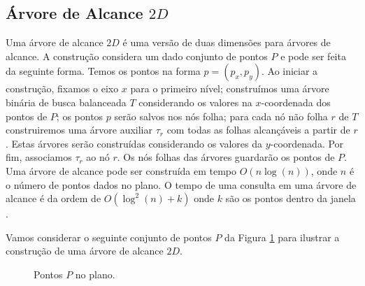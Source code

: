 \subsection{Árvore de Alcance $2D$}

Uma árvore de alcance $2D$ é uma versão de duas dimensões para árvores de alcance. A construção considera um dado conjunto de pontos $P$ e pode ser feita da seguinte forma.
Temos os pontos na forma $p = (p_x, p_y)$. Ao iniciar a construção, fixamos o eixo $x$ para o primeiro nível; construímos uma árvore binária de busca balanceada $T$ considerando os valores na $x$-coordenada dos pontos de $P$; os pontos $p$ serão salvos nos nós folha; para cada nó não folha $r$ de $T$ construiremos uma árvore auxiliar $\tau_r$ com todas as folhas alcançáveis a partir de $r$. Estas árvores serão construídas considerando os valores da $y$-coordenada. Por fim, associamos $\tau_r$ ao nó $r$. Os nós folhas das árvores guardarão os pontos de $P$. Uma árvore de alcance pode ser construída em tempo $O(n\log(n))$, onde $n$ é o número de pontos dados no plano. O tempo de uma consulta em uma árvore de alcance é da ordem de $O(\log^2(n) + k)$ onde $k$ são os pontos dentro da janela \cite{cg08}. %

Vamos considerar o seguinte conjunto de pontos $P$ da Figura \ref{fig:9} para ilustrar a construção de uma árvore de alcance $2D$.
\begin{figure}[H]
\centering
{}
\caption{Pontos $P$ no plano.}
\label{fig:9}
\end{figure}

